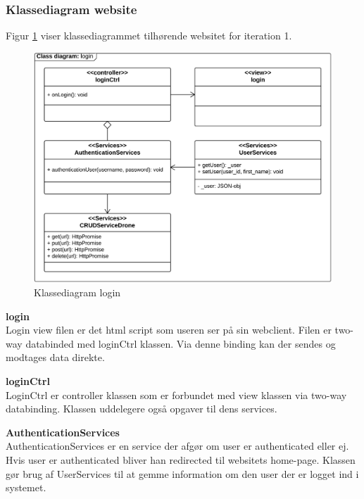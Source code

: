 \subsubsection*{Klassediagram website}
\vspace{-0.2cm}
Figur \ref{fig:classDiagram_login} viser klassediagrammet tilhørende websitet for iteration 1.
\vspace{-0.2cm}
\begin{figure}[H]
	\centering
	\includegraphics[width=1\textwidth]{Billeder/klasse_diagrammer/login_class_diagram.png}
	\vspace{-0.5cm}
	\caption{Klassediagram login}
	\label{fig:classDiagram_login}
\end{figure}

\vspace{-0.2cm}

\textbf{login} \\
Login view filen er det html script som useren ser på sin webclient. Filen er two-way databinded med loginCtrl klassen. Via denne binding kan der sendes og modtages data direkte.

\textbf{loginCtrl} \\
LoginCtrl er controller klassen som er forbundet med view klassen via two-way databinding. Klassen uddelegere også opgaver til dens services.

\textbf{AuthenticationServices} \\
AuthenticationServices er en service der afgør om user er authenticated eller ej. Hvis user er authenticated bliver han redirected til websitets home-page. Klassen gør brug af UserServices til at gemme information om den user der er logget ind i systemet.

